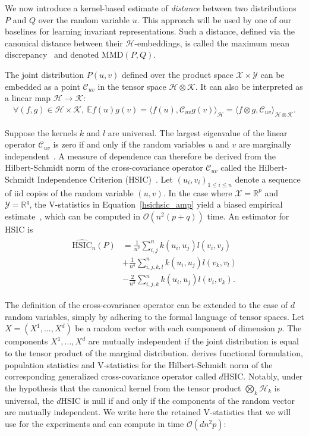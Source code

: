 We now introduce a kernel-based estimate of \emph{distance} between two distributions $P$ and $Q$ over the random variable $u$. This approach will be used by one of our baselines for learning invariant representations. Such a distance, defined via the canonical distance between their $\mathcal{H}$-embeddings, is called the maximum mean discrepancy~\cite{MMD} and denoted $\text{MMD}(P, Q)$. 

The joint distribution $P(u, v)$ defined over the product space $\mathcal{X} \times \mathcal{Y}$ can be embedded as a point $\mathcal{C}_{uv}$ in the tensor space $\mathcal{H} \otimes \mathcal{K}$. It can also be interpreted as a linear map $\mathcal{H} \rightarrow \mathcal{K}$:
\begin{align}
\forall (f, g) \in \mathcal{H} \times \mathcal{K},~ \mathbb{E}f(u)g(v) = \langle f(u) ,\mathcal{C}_{uv}g(v) \rangle_\mathcal{H} = \langle f\otimes g, \mathcal{C}_{uv}\rangle_{\mathcal{H} \otimes \mathcal{K}}.
\end{align}

Suppose the kernels $k$ and $l$ are universal. The largest eigenvalue of the linear operator $\mathcal{C}_{uv}$ is zero if and only if the random variables $u$ and $v$ are marginally independent~\cite{Gretton2005}. A measure of dependence can therefore be derived from the Hilbert-Schmidt norm of the cross-covariance operator $\mathcal{C}_{uv}$ called the Hilbert-Schmidt Independence Criterion (HSIC)~\cite{HSIC}. Let $(u_i, v_i)_{1 \leq i \leq n}$ denote a sequence of iid copies of the random variable $(u, v)$. In the case where $\mathcal{X} = \mathbb{R}^p$ and $\mathcal{Y} = \mathbb{R}^q$, the V-statistics in Equation~\ref{hsichsic_amp} yield a biased empirical estimate~\cite{NIPS2007_3340}, which can be computed in $\mathcal{O}(n^2(p+q))$ time.
An estimator for HSIC is
\begin{align}\label{hsichsic_amp}
\begin{split}
\hat{\text{HSIC}}_n(P) &= \frac{1}{n^2}\sum_{i, j}^n k(u_i, u_j)l(v_i, v_j) \\
&+ \frac{1}{n^4}\sum_{i, j, k, l}^n k(u_i, u_j)l(v_k, v_l) \\
&- \frac{2}{n^3}\sum_{i, j, k}^n k(u_i, u_j)l(v_i, v_k).
\end{split}
\end{align}

The definition of the cross-covariance operator can be extended to the case of $d$ random variables, simply by adhering to the formal language of tensor spaces. Let $X = (X^1, ..., X^d)$ be a random vector with each component of dimension $p$. The components $X^1, ..., X^d$ are mutually independent if the joint distribution is equal to the tensor product of the marginal distribution. \cite{Pfister2016} derives functional formulation, population statistics and V-statistics for the Hilbert-Schmidt norm of the corresponding generalized cross-covariance operator called $d$HSIC. Notably, under the hypothesis that the canonical kernel from the tensor product $\bigotimes_k\mathcal{H}_k$ is universal, the $d$HSIC is null if and only if the components of the random vector are mutually independent. We write here the retained V-statistics that we will use for the experiments and can compute in time $\mathcal{O}(dn^2p)$:

